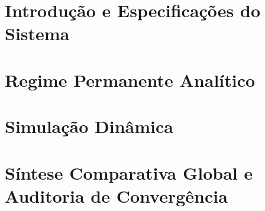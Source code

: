 \documentclass[12pt, a4paper]{report}
\begin{document}

\tableofcontents
\clearpage

\chapter{Introdução e Especificações do Sistema}
\label{cap:introducao}



\chapter{Regime Permanente Analítico}
\label{cap:regime_permanente}






\chapter{Simulação Dinâmica}
\label{cap:simulacao_dinamica}






\chapter{Síntese Comparativa Global e Auditoria de Convergência}
\label{cap:sintese_global}


\end{document}

